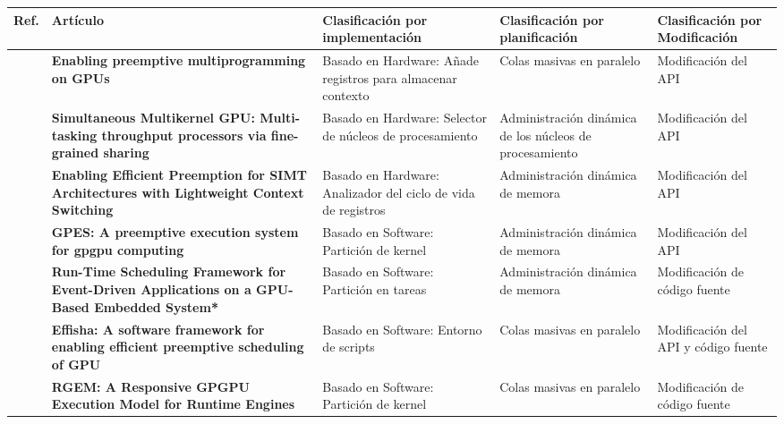   \begin{table}[h!]
      \begin{center}
            \scriptsize
        \begin{tabular}{|m{.6cm}|m{6cm}|m{2.7cm}|m{2.6cm}|m{2.6cm}|}
         \hline
        \cellcolor{lightgray}\textbf{Ref.} & \cellcolor{lightgray} \textbf{Artículo} & \cellcolor{lightgray} \textbf{Clasificación por implementación} & \cellcolor{lightgray} \textbf{Clasificación por planificación} & \cellcolor{lightgray} \textbf{Clasificación por Modificación}  \\ 
         \hline
          \textbf{\cite{18}} & \textbf{Enabling preemptive multiprogramming on GPUs} &  Basado en Hardware: Añade registros para almacenar contexto & Colas masivas en paralelo & Modificación del API\\
           \hline
          \textbf{\cite{20}} & \textbf{Simultaneous Multikernel GPU: Multi-tasking throughput processors via fine-grained sharing} &  Basado en Hardware: Selector de núcleos de procesamiento & Administración dinámica de los núcleos de procesamiento &Modificación del API\\
           \hline
           \textbf{\cite{8}} & \textbf{Enabling Efficient Preemption for SIMT Architectures with Lightweight Context Switching} &  Basado en Hardware: Analizador del ciclo de vida de registros & Administración dinámica de memora &Modificación del API\\
           \hline
             \textbf{\cite{GPES}} & \textbf{GPES: A preemptive execution system for gpgpu computing} & Basado en Software: Partición de kernel & Administración dinámica de memora &Modificación del API\\
           \hline
             \textbf{\cite{RTFG}} & \textbf{Run-Time Scheduling Framework for Event-Driven Applications on a GPU-Based Embedded System*} & Basado en Software: Partición en tareas & Administración dinámica de 	memora &Modificación de código fuente\\
            \hline
            \textbf{\cite{Effisha}} & \textbf{Effisha: A software framework for enabling efficient preemptive scheduling of GPU} & Basado en Software: Entorno de scripts & Colas masivas en paralelo &Modificación del API y código fuente\\
            \hline
          \textbf{\cite{RGEM}} & \textbf{RGEM: A Responsive GPGPU Execution Model for Runtime Engines} & Basado en Software: Partición de kernel & Colas masivas en paralelo &Modificación de código fuente\\

\end{tabular}
\end{center}
\end{table}
